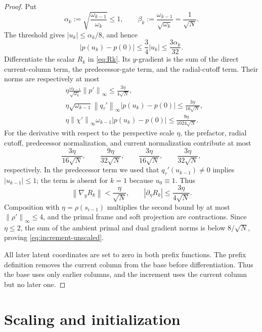 \documentclass[11pt,a4paper]{article}
\newcommand{\norm}[1]{\left\lVert #1\right\rVert}
\theoremstyle{definition}
\theoremstyle{remark}
\numberwithin{equation}{section}
\begin{document}
\begin{proof}
Put
\[
 \alpha_k:=\sqrt{\frac{\omega_{k-1}}{\omega_k}}\le1,
 \qquad
 \beta_k:=\frac{\omega_{k-1}}{\sqrt{\omega_k}}=\frac1{\sqrt N}.
\]
The threshold gives $|u_k|\le\alpha_k/8$, and hence
\begin{equation}
 |p(u_k)-p(0)|
 \le\frac34|u_k|
 \le\frac{3\alpha_k}{32}.
 \label{eq:delta-p-bound}
\end{equation}
Differentiate the scalar $R_k$ in \eqref{eq:Rk}.  Its $y$-gradient is the sum of the direct current-column term, the predecessor-gate term, and the radial-cutoff term.  Their norms are respectively at most
\begin{align*}
 &\eta\frac{\omega_{k-1}}{\sqrt{\omega_k}}\norm{p'}_\infty
   \le\frac{3\eta}{4\sqrt N},\\
 &\eta\sqrt{\omega_{k-1}}\norm{q_\tau'}_\infty
   |p(u_k)-p(0)|
   \le\frac{3\eta}{16\sqrt N},\\
 &\eta\norm{\chi'}_\infty\omega_{k-1}|p(u_k)-p(0)|
   \le\frac{9\eta}{1024\sqrt N}.
\end{align*}
For the derivative with respect to the perspective scale $\eta$, the prefactor, radial cutoff, predecessor normalization, and current normalization contribute at most
\[
 \frac{3\eta}{16\sqrt N},
 \qquad
 \frac{9\eta}{32\sqrt N},
 \qquad
 \frac{3\eta}{16\sqrt N},
 \qquad
 \frac{3\eta}{32\sqrt N},
\]
respectively.  In the predecessor term we used that
$q_\tau'(u_{k-1})\ne0$ implies $|u_{k-1}|\le1$; the term is absent for $k=1$ because $u_0\equiv1$.
Thus
\[
 \norm{\nabla_yR_k}<\frac{\eta}{\sqrt N},
 \qquad
 |\partial_\eta R_k|\le\frac{3\eta}{4\sqrt N}.
\]
Composition with $\eta=\rho(s_{i-1})$ multiplies the second bound by at most
$\norm{\rho'}_\infty\le4$, and the primal frame and soft projection are contractions.  Since $\eta\le2$, the sum of the ambient primal and dual gradient norms is below $8/\sqrt N$, proving \eqref{eq:increment-unscaled}.

All later latent coordinates are set to zero in both prefix functions.
The prefix definition removes the current column from the base before
differentiation. Thus the base uses only earlier columns, and the
increment uses the current column but no later one.
\end{proof}

\section{Scaling and initialization}
\label{sec:scaling}
\end{document}
